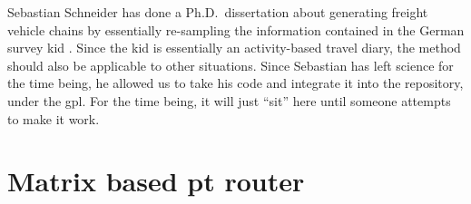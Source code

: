 

Sebastian Schneider has done a Ph.D.\ dissertation about generating freight vehicle chains by essentially re-sampling the information contained in the German survey \gls{kid} \citep{SteinmeyerWagner2005KiD}.  
Since the \gls{kid} is essentially an activity-based travel diary, the method should also be applicable to other situations.
Since Sebastian has left science for the time being, he allowed us to take his code and integrate it into the repository, under the \gls{gpl}. For the time being, it will just ``sit'' here until someone attempts to make it work.

%


\section{Matrix based pt router}
\label{sec:matrix-based-pt-router}




